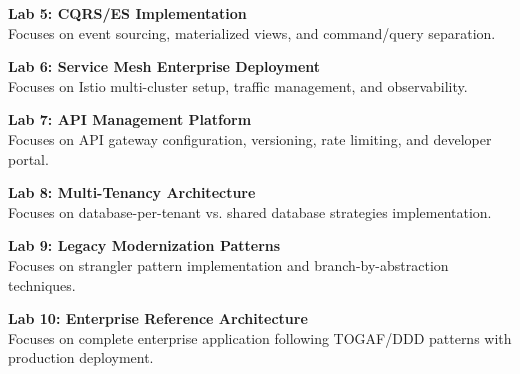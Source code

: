 \noindent\textbf{Lab 5: CQRS/ES Implementation} \\
Focuses on event sourcing, materialized views, and command/query separation.

\vspace{0.2cm}

\noindent\textbf{Lab 6: Service Mesh Enterprise Deployment} \\
Focuses on Istio multi-cluster setup, traffic management, and observability.

\vspace{0.2cm}

\noindent\textbf{Lab 7: API Management Platform} \\
Focuses on API gateway configuration, versioning, rate limiting, and developer portal.

\vspace{0.2cm}

\noindent\textbf{Lab 8: Multi-Tenancy Architecture} \\
Focuses on database-per-tenant vs. shared database strategies implementation.

\vspace{0.2cm}

\noindent\textbf{Lab 9: Legacy Modernization Patterns} \\
Focuses on strangler pattern implementation and branch-by-abstraction techniques.

\vspace{0.2cm}

\noindent\textbf{Lab 10: Enterprise Reference Architecture} \\
Focuses on complete enterprise application following TOGAF/DDD patterns with production deployment.

\vspace{0.2cm}

\newpage
{}
